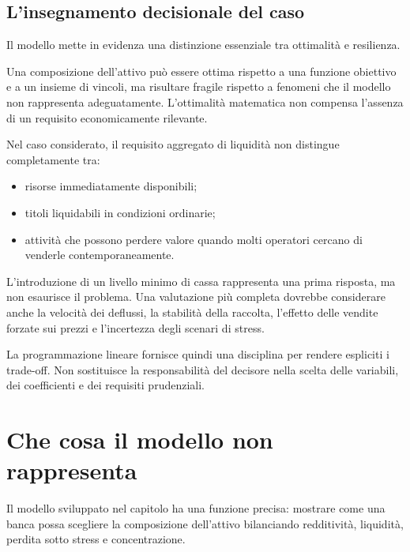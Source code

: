 \subsection{L'insegnamento decisionale del caso}

Il modello mette in evidenza una distinzione essenziale tra ottimalit\`a e
resilienza.

Una composizione dell'attivo pu\`o essere ottima rispetto a una funzione
obiettivo e a un insieme di vincoli, ma risultare fragile rispetto a fenomeni
che il modello non rappresenta adeguatamente. L'ottimalit\`a matematica non
compensa l'assenza di un requisito economicamente rilevante.

Nel caso considerato, il requisito aggregato di liquidit\`a non distingue
completamente tra:

\begin{itemize}

\item risorse immediatamente disponibili;

\item titoli liquidabili in condizioni ordinarie;

\item attivit\`a che possono perdere valore quando molti operatori cercano di
venderle contemporaneamente.

\end{itemize}

L'introduzione di un livello minimo di cassa rappresenta una prima risposta,
ma non esaurisce il problema. Una valutazione pi\`u completa dovrebbe
considerare anche la velocit\`a dei deflussi, la stabilit\`a della raccolta,
l'effetto delle vendite forzate sui prezzi e l'incertezza degli scenari di
stress.

La programmazione lineare fornisce quindi una disciplina per rendere espliciti
i trade-off. Non sostituisce la responsabilit\`a del decisore nella scelta
delle variabili, dei coefficienti e dei requisiti prudenziali.

\section{Che cosa il modello non rappresenta}

\label{sec:cap11-limiti-modello}

Il modello sviluppato nel capitolo ha una funzione precisa: mostrare come una
banca possa scegliere la composizione dell'attivo bilanciando redditivit\`a,
liquidit\`a, perdita sotto stress e concentrazione.

